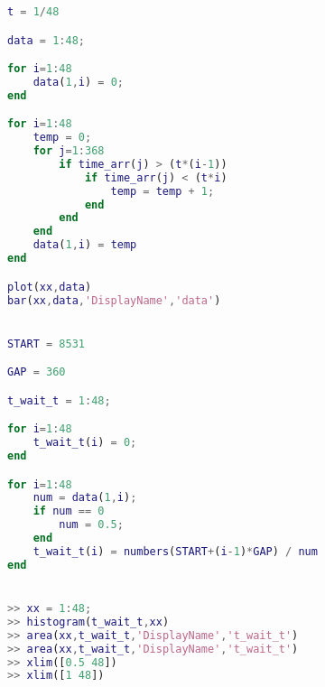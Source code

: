 \documentclass[withoutpreface,bwprint]{cumcmthesis} %
\begin{document}
\begin{appendices}
\begin{lstlisting}[language=Matlab]
t = 1/48

data = 1:48;

for i=1:48
    data(1,i) = 0;
end

for i=1:48
    temp = 0;
    for j=1:368
        if time_arr(j) > (t*(i-1))
            if time_arr(j) < (t*i)
                temp = temp + 1;               
            end
        end
    end
    data(1,i) = temp
end

plot(xx,data)
bar(xx,data,'DisplayName','data')


START = 8531

GAP = 360

t_wait_t = 1:48;

for i=1:48
    t_wait_t(i) = 0; 
end

for i=1:48
    num = data(1,i);
    if num == 0
        num = 0.5;
    end
    t_wait_t(i) = numbers(START+(i-1)*GAP) / num
end


>> xx = 1:48;
>> histogram(t_wait_t,xx)
>> area(xx,t_wait_t,'DisplayName','t_wait_t')
>> area(xx,t_wait_t,'DisplayName','t_wait_t')
>> xlim([0.5 48])
>> xlim([1 48])
\end{lstlisting}





\end{appendices}
\end{document}
